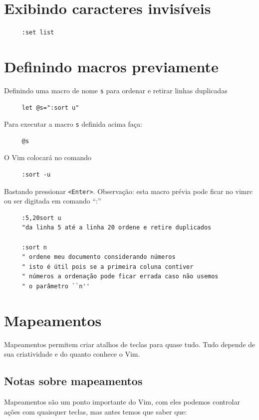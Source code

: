 \documentclass[10pt,a4paper,openany]{book}
\begin{document}
\section{Exibindo caracteres invisíveis}
\label{Exibindo caracteres invisíveis}

\begin{verbatim}
     :set list
\end{verbatim}

\section{Definindo macros previamente}
\label{Definindo macros previamente}
Definindo uma macro de nome \verb|s| para ordenar e retirar linhas duplicadas

\begin{verbatim}
     let @s=":sort u"
\end{verbatim}

Para executar a macro \verb|s| definida acima faça:

\begin{verbatim}
     @s
\end{verbatim}

O Vim colocará no comando

\begin{verbatim}
     :sort -u
\end{verbatim}

Bastando pressionar \verb|<Enter>|.
Observação: esta macro prévia pode ficar no vimrc ou ser digitada em comando ``:''


\begin{verbatim}
     :5,20sort u
     "da linha 5 até a linha 20 ordene e retire duplicados
     
     :sort n
     " ordene meu documento considerando números
     " isto é útil pois se a primeira coluna contiver
     " números a ordenação pode ficar errada caso não usemos
     " o parâmetro ``n''
\end{verbatim}

\section{Mapeamentos}\label{Mapeamentos}

Mapeamentos permitem criar atalhos de teclas para quase tudo. Tudo depende de
sua criatividade e do quanto conhece o Vim. 


\subsection{Notas sobre mapeamentos}\label{Notas sobre mapeamentos}
Mapeamentos são um ponto importante do Vim, com eles podemos controlar
ações com quaisquer teclas, mas antes temos que saber que:
\end{document}
